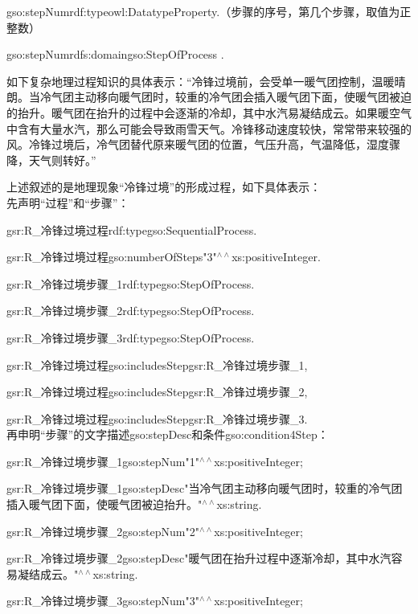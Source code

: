 gso:stepNum\quad rdf:type\quad owl:DatatypeProperty\quad .\quad （步骤的序号，第几个步骤，取值为正整数）

gso:stepNum\quad rdfs:domain\quad gso:StepOfProcess .

如下复杂地理过程知识的具体表示：“冷锋过境前，会受单一暖气团控制，温暖晴朗。当冷气团主动移向暖气团时，较重的冷气团会插入暖气团下面，使暖气团被迫的抬升。暖气团在抬升的过程中会逐渐的冷却，其中水汽易凝结成云。如果暖空气中含有大量水汽，那么可能会导致雨雪天气。冷锋移动速度较快，常常带来较强的风。冷锋过境后，冷气团替代原来暖气团的位置，气压升高，气温降低，湿度骤降，天气则转好。”

上述叙述的是地理现象“冷锋过境”的形成过程，如下具体表示：\\
先声明“过程”和“步骤”：

gsr:R\_冷锋过境过程\quad rdf:type\quad \quad gso:SequentialProcess\quad .

gsr:R\_冷锋过境过程\quad gso:numberOfSteps\quad "3"$^{\land\land}$xs:positiveInteger\quad .

gsr:R\_冷锋过境步骤\_1\quad rdf:type\quad \quad gso:StepOfProcess\quad .

gsr:R\_冷锋过境步骤\_2\quad rdf:type\quad \quad gso:StepOfProcess\quad .

gsr:R\_冷锋过境步骤\_3\quad rdf:type\quad \quad gso:StepOfProcess\quad .

gsr:R\_冷锋过境过程\quad gso:includesStep\quad gsr:R\_冷锋过境步骤\_1\quad ,\quad 

gsr:R\_冷锋过境过程\quad gso:includesStep\quad gsr:R\_冷锋过境步骤\_2\quad ,\quad 

gsr:R\_冷锋过境过程\quad gso:includesStep\quad gsr:R\_冷锋过境步骤\_3\quad .
\\
再申明“步骤”的文字描述gso:stepDesc和条件gso:condition4Step：

gsr:R\_冷锋过境步骤\_1\quad gso:stepNum\quad "1"$^{\land\land}$xs:positiveInteger\quad ;

gsr:R\_冷锋过境步骤\_1\quad gso:stepDesc\quad "当冷气团主动移向暖气团时，较重的冷气团插入暖气团下面，使暖气团被迫抬升。"$^{\land\land}$xs:string\quad .

gsr:R\_冷锋过境步骤\_2\quad gso:stepNum\quad "2"$^{\land\land}$xs:positiveInteger\quad ;

gsr:R\_冷锋过境步骤\_2\quad gso:stepDesc\quad "暖气团在抬升过程中逐渐冷却，其中水汽容易凝结成云。"$^{\land\land}$xs:string\quad .

gsr:R\_冷锋过境步骤\_3\quad gso:stepNum\quad "3"$^{\land\land}$xs:positiveInteger\quad ;


